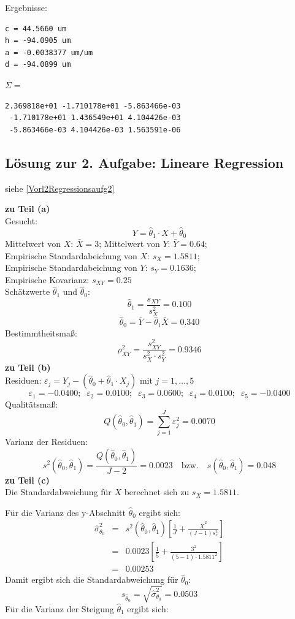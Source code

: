 Ergebnisse:
\begin{verbatim}
c = 44.5660 um
h = -94.0905 um
a = -0.0038377 um/um
d = -94.0899 um
\end{verbatim}

$\Sigma =$
\begin{verbatim}
2.369818e+01 -1.710178e+01 -5.863466e-03
 -1.710178e+01 1.436549e+01 4.104426e-03
 -5.863466e-03 4.104426e-03 1.563591e-06
\end{verbatim}



\subsection{Lösung zur 2. Aufgabe: Lineare Regression}
siehe \ref{Vorl2Regressionsaufg2}

\textbf{zu Teil (a)} \\
Gesucht: 
\[
Y = \hat\theta_1 \cdot X + \hat \theta_0 
\]
Mittelwert von $X$: $\bar{X} = 3$; Mittelwert von $Y$: $\bar{Y} = 0.64$; \\
Empirische Standardabeichung von $X$: $s_X = 1.5811$; \\
Empirische Standardabeichung von $Y$: $s_Y = 0.1636$; \\
Empirische Kovarianz: $s_{XY} = 0.25$ \\
Schätzwerte $\hat{\theta}_1$ und $\hat{\theta}_0$:
\[
\hat{\theta}_1 = \frac{s_{XY} }{s_X^2 } = 0.100
\]
\[
\hat{\theta}_0 = \bar {Y} - \hat{\theta}_1 \bar {X} = 0.340
\]
Bestimmtheitsmaß:
\[
\rho_{XY}^2 = \frac{s
_{XY}^2 }{s_X^2 \cdot s_Y^2 } = 0.9346
\]
\textbf{zu Teil (b)} \\
Residuen: $\varepsilon_j = Y_j -(\hat\theta _0 + \hat\theta _1 \cdot X_j)$
mit $j=1,\ldots ,5$
 \[\varepsilon_1 = -0.0400; \;\; \varepsilon_2 =  0.0100;\;\;
 \varepsilon_3= 0.0600;\;\; \varepsilon_4 =0.0100;\;\;
  \varepsilon_5 = -0.0400
 \]
Qualitätsmaß:
\[
Q(\hat\theta _0,\hat\theta _1) = \sum\limits_{j = 1}^J {\varepsilon_j ^2 } 
= 0.0070
\]
Varianz der Residuen:
\[
s^2(\hat{\theta}_0 ,\hat{\theta}_1 ) = \frac{Q(\hat{\theta}_0 ,
	\hat{\theta}_1 )}{J - 2} = 0.0023 \quad \text{bzw.} \quad
     s(\hat{\theta}_0 ,\hat{\theta}_1 ) = 0.048 
\]
\textbf{zu Teil (c)} \\
Die Standardabweichung für $X$ berechnet sich zu $s_X = 1.5811$.

Für die Varianz des y-Abschnitt $\hat\theta_0$ ergibt sich: 
\begin{eqnarray}
\hat\sigma_{\theta_0}^2 &=& s^2(\hat{\theta}_0 ,\hat{\theta}_1 )
\left[\frac{1}{J} + \frac{\bar{X}^2}{(J-1)s_x^2 } \right]
\nonumber \\ 
&=& 
0.0023
\left[\frac{1}{5} + \frac{3^2}{(5-1)\cdot 1.5811^2 } \right]
 \nonumber\\ 
&=& 0.00253 \nonumber
\end{eqnarray}
Damit ergibt sich die Standardabweichung für $\hat\theta_0$:
\[
s_{\hat\theta_0} = \sqrt{\hat\sigma_{\theta_0}^2} = 0.0503
\]
Für die Varianz der Steigung $\hat\theta_1$ ergibt sich: 

